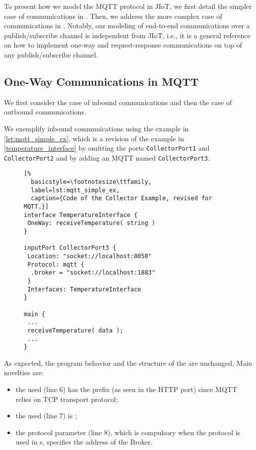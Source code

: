 To present how we model the MQTT protocol in JIoT, we first detail the simpler
case of  communications in . Then, we
address the more complex case of  communications in
. Notably, our modeling of end-to-end communications over
a publish/subscribe channel is independent from JIoT, i.e., it is a general
reference on how to implement one-way and request-response communications on
top of any publish/subscribe channel.

\subsection{One-Way Communications in MQTT}
\label{sub:ow_in_mqtt}

We first consider the case of inbound communications and then the case of
outbound communications.

We exemplify  inbound communications using the example in
\cref{lst:mqtt_simple_ex}, which is a revision of the example in
\cref{temperature_interface} by omitting the ports 
\texttt{CollectorPort1} and \texttt{CollectorPort2} and 
by adding an MQTT  named \texttt{CollectorPort3}.

\begin{figure}[t]
\begin{lstlisting}[%
  basicstyle=\footnotesize\ttfamily,
  label=lst:mqtt_simple_ex, 
  caption={Code of the Collector Example, revised for MQTT.}]
interface TemperatureInterface {
 OneWay: receiveTemperature( string )
}

inputPort CollectorPort3 {
 Location: "socket://localhost:8050"
 Protocol: mqtt {
  .broker = "socket://localhost:1883"
 }
 Interfaces: TemperatureInterface
}

main {
 ...
 receiveTemperature( data );
 ...
}
\end{lstlisting}
\end{figure}

As expected, the program behavior and the structure of the 
are unchanged. Main novelties are:
%
\begin{itemize}
  \item the used  (line 6) has the prefix 
   (as seen in the HTTP port) since MQTT relies on TCP
  transport protocol;
  \item the used  (line 7) is ;
  \item the  protocol parameter (line 8), which is
  compulsory when the  protocol is used in s,
  specifies the address of the Broker.
\end{itemize}

